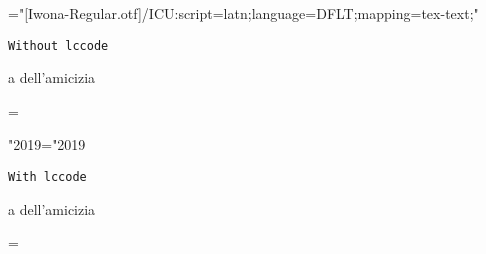 
\font\1="[Iwona-Regular.otf]/ICU:script=latn;language=DFLT;mapping=tex-text;"

\newdimen\savehsize
\savehsize\hsize

\1

{\tt Without lccode}

\hsize=3pt

\noindent a dell'amicizia

\hsize=\savehsize

\lccode"2019="2019

{\tt With lccode}

\hsize=3pt

\noindent a dell'amicizia

\hsize=\savehsize

\bye
